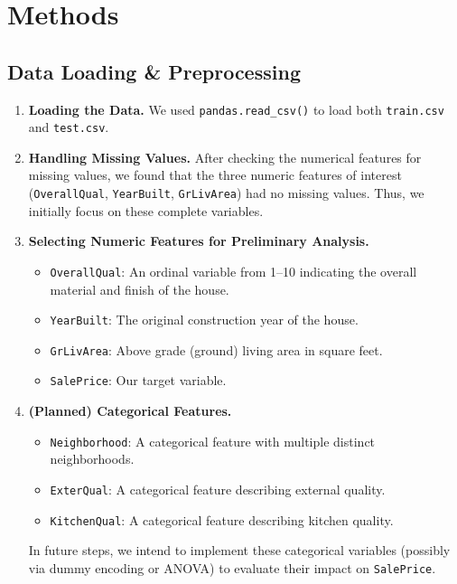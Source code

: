 \documentclass{article}
\begin{document}
\section{Methods}

\subsection{Data Loading \& Preprocessing}

\begin{enumerate}
    \item \textbf{Loading the Data.} We used \texttt{pandas.read\_csv()} to load both \texttt{train.csv} and \texttt{test.csv}.
    \item \textbf{Handling Missing Values.} After checking the numerical features for missing values, we found that the three numeric features of interest (\texttt{OverallQual}, \texttt{YearBuilt}, \texttt{GrLivArea}) had no missing values. Thus, we initially focus on these complete variables.
    \item \textbf{Selecting Numeric Features for Preliminary Analysis.}
    \begin{itemize}
        \item \texttt{OverallQual}: An ordinal variable from 1--10 indicating the overall material and finish of the house.
        \item \texttt{YearBuilt}: The original construction year of the house.
        \item \texttt{GrLivArea}: Above grade (ground) living area in square feet.
        \item \texttt{SalePrice}: Our target variable.
    \end{itemize}
    \item \textbf{(Planned) Categorical Features.}
    \begin{itemize}
        \item \texttt{Neighborhood}: A categorical feature with multiple distinct neighborhoods.
        \item \texttt{ExterQual}: A categorical feature describing external quality.
        \item \texttt{KitchenQual}: A categorical feature describing kitchen quality.
    \end{itemize}
    In future steps, we intend to implement these categorical variables (possibly via dummy encoding or ANOVA) to evaluate their impact on \texttt{SalePrice}.
\end{enumerate}
\end{document}
